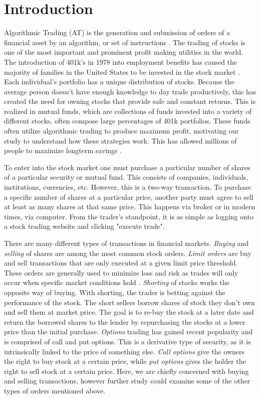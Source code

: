 \documentclass[../thesis.tex]{subfiles}
\begin{document}
\chapter{Introduction}
\label{ch:intro}

Algorithmic Trading (AT) is the generation and submission of orders of a financial asset by an algorithm, or set of instructions \cite{Treleaven2013}. The trading of stocks is one of the most important and prominent profit making utilities in the world. The introduction of 401k's in 1978 into employment benefits has caused the majority of families in the United States to be invested in the stock market \cite{Stobierski2018}. Each individual's portfolio has a unique distribution of stocks. Because the average person doesn't have enough knowledge to day trade productively, this has created the need for owning stocks that provide safe and constant returns. This is realized in mutual funds, which are collections of funds invested into a variety of different stocks, often compose large percentages of 401k portfolios. These funds often utilize algorithmic trading to produce maximum profit, motivating our study to understand how these strategies work. This has allowed millions of people to maximize longterm savings \cite{Treleaven2013}.

To enter into the stock market one must purchase a particular number of shares of a particular security or mutual fund. This consists of companies, individuals, institutions, currencies, etc. However, this is a two-way transaction. To purchase a specific number of shares at a particular price, another party must agree to sell at least as many shares at that same price. This happens via broker or in modern times, via computer. From the trader's standpoint, it is as simple as logging onto a stock trading website and clicking "execute trade". 

There are many different types of transactions in financial markets. \textit{Buying} and \textit{selling} of shares are among the most common stock orders. \textit {Limit orders} are buy and sell transactions that are only executed at a given limit price threshold. These orders are generally used to minimize loss and risk as trades will only occur when specific market conditions hold \cite{Aldridge2010}. \textit{Shorting} of stocks works the opposite way of buying. With shorting, the trader is betting against the performance of the stock. The short sellers borrow shares of stock they don't own and sell them at market price. The goal is to re-buy the stock at a later date and return the borrowed shares to the lender by repurchasing the stocks at a lower price than the initial purchase. \textit {Options} trading has gained recent popularity and is comprised of call and put options. This is a derivative type of security, as it is intrinsically linked to the price of something else. \textit {Call options} give the owners the right to buy stock at a certain price, while \textit{put options} gives the holder the right to sell stock at a certain price. Here, we are chiefly concerned with buying and selling transactions, however further study could examine some of the other types of orders mentioned above. 
\end{document}
